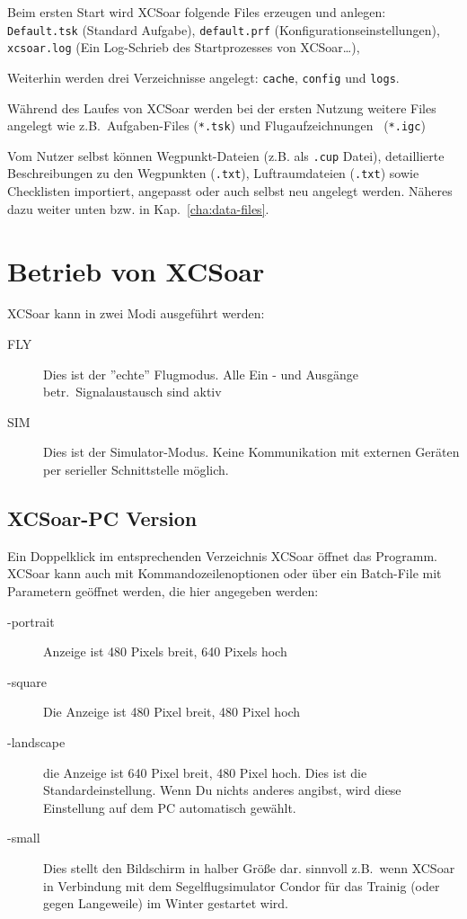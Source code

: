 Beim ersten Start wird {\textsf  XCSoar}  folgende Files erzeugen und anlegen: 
\texttt{Default.tsk} (Standard Aufgabe),  \texttt{default.prf} (Konfigurationseinstellungen), \texttt{xcsoar.log} 
(Ein Log-Schrieb des Startprozesses von {\textsf  XCSoar}\dots), 



Weiterhin werden drei Verzeichnisse angelegt: \texttt{cache}, \texttt{config} und \texttt{logs}.  

Während des Laufes von {\textsf  XCSoar} werden bei der ersten Nutzung weitere Files angelegt wie z.B.\  Aufgaben-Files (\texttt{*.tsk}) 
und Flugaufzeichnungen \ (\texttt{*.igc})

Vom Nutzer selbst können Wegpunkt-Dateien (z.B. als \texttt{.cup} Datei), detaillierte Beschreibungen zu den Wegpunkten (\texttt{.txt}),  Luftraumdateien (\texttt{.txt}) sowie Checklisten importiert, angepasst oder auch selbst neu angelegt werden. Näheres dazu weiter unten bzw. in Kap.~\ref{cha:data-files}.


\section{Betrieb von {\textsf  XCSoar}}

{\textsf  XCSoar} kann in zwei Modi ausgeführt werden:
\begin{description}
\item[FLY] Dies ist der ''echte'' Flugmodus. Alle Ein - und Ausgänge betr.\ Signalaustausch sind aktiv
\item[SIM] Dies ist der Simulator-Modus. Keine Kommunikation mit externen Geräten per serieller Schnittstelle möglich. 
\end{description}

\subsection*{{\textsf  XCSoar}-PC Version}
Ein Doppelklick im entsprechenden Verzeichnis {\textsf  XCSoar} öffnet das Programm. 
{\textsf  XCSoar} kann auch mit Kommandozeilenoptionen oder über ein Batch-File mit Parametern geöffnet werden, 
die hier angegeben werden: 

\begin{description}
\item[-portrait] Anzeige ist 480 Pixels breit, 640 Pixels hoch
\item[-square] Die Anzeige ist 480 Pixel breit, 480 Pixel hoch
\item[-landscape] die Anzeige ist 640 Pixel breit, 480 Pixel hoch. Dies ist die Standardeinstellung.
Wenn Du nichts anderes angibst, wird diese Einstellung auf dem PC automatisch gewählt.
\item[-small] Dies stellt den Bildschirm in halber Größe dar. sinnvoll z.B.\ wenn {\textsf  XCSoar} in Verbindung mit dem Segelflugsimulator 
{\sc Condor} für das Trainig (oder gegen Langeweile) im Winter gestartet wird.
\end{description}


